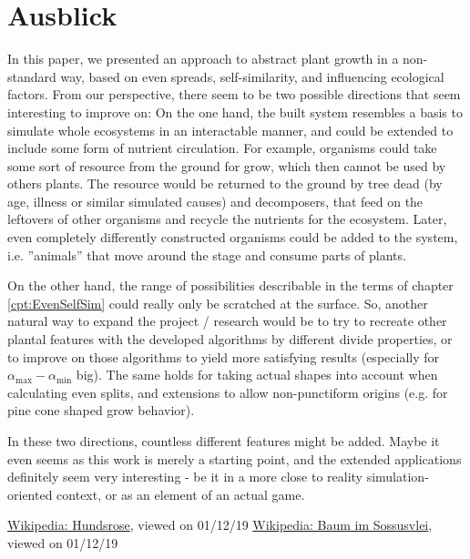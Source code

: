 \documentclass[11pt]{scrartcl}
\begin{document}
\section{Ausblick}
In this paper, we presented an approach to abstract plant growth in a non-standard way, based on even spreads, self-similarity, and influencing ecological factors. From our perspective, there seem to be two possible directions that seem interesting to improve on: On the one hand, the built system resembles a basis to simulate whole ecosystems in an interactable manner, and could be extended to include some form of nutrient circulation. For example, organisms could take some sort of resource from the ground for grow, which then cannot be used by others plants. The resource would be returned to the ground by tree dead (by age, illness or similar simulated causes) and decomposers, that feed on the leftovers of other organisms and recycle the nutrients for the ecosystem. Later, even completely differently constructed organisms could be added to the system, i.e. ''animals'' that move around the stage and consume parts of plants.

On the other hand, the range of possibilities describable in the terms of chapter \ref{cpt:EvenSelfSim} could really only be scratched at the surface. So, another natural way to expand the project / research would be to try to recreate other plantal features with the developed algorithms by different divide properties, or to improve on those algorithms to yield more satisfying results (especially for $\alpha_\text{max} - \alpha_\text{min}$ big). The same holds for taking actual shapes into account when calculating even splits, and extensions to allow non-punctiform origins (e.g. for pine cone shaped grow behavior).

In these two directions, countless different features might be added. Maybe it even seems as this work is merely a starting point, and the extended applications definitely seem very interesting - be it in a more close to reality simulation-oriented context, or as an element of an actual game.

\begin{thebibliography}{9}
	  \href{https://de.wikipedia.org/wiki/Rosen#/media/File:Hundsrose.jpg}{Wikipedia: Hundsrose}, viewed on 01/12/19
	  \href{https://upload.wikimedia.org/wikipedia/commons/a/a5/Baum_im_Sossusvlei.jpg}{Wikipedia: Baum im Sossusvlei}, viewed on 01/12/19
\end{thebibliography}
\end{document}
